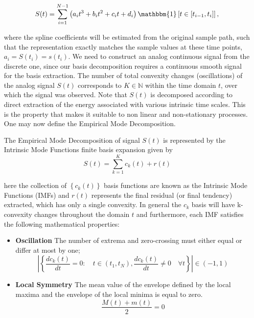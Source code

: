 \begin{equation}
\label{cubic_spl}
S(t) = \sum_{i=1}^{N-1} \left(a_i t^3 +b_i t^2 + c_i t +d_i \right) \mathbbm{1} \left[ t \in \left[ t_{i-1},t_i \right] \right],
\end{equation} 

where the spline coefficients will be estimated from the original sample path, such that the representation exactly matches the sample values at these time points, $a_i = S(t_i) = s(t_i)$. We need to construct an analog continuous signal from the discrete one, since our basis decomposition requires a continuous smooth signal for the basis extraction. The number of total convexity changes (oscillations) of the analog signal $S(t)$ corresponds to $K \in \mathbb{N}$ within the time domain $t$, over which the signal was observed. Note that $S(t)$ is decomposed according to direct extraction of the energy associated with various intrinsic time scales. This is the property that makes it suitable to non linear and non-stationary processes. One may now define the  Empirical Mode Decomposition.


\begin{Definition}

The Empirical Mode Decomposition of signal $S(t)$ is represented by the Intrinsic Mode Functions finite basis expansion given by
\begin{equation}
\label{EMD-for}
S(t) = \sum_{k=1}^K c_k \left(t\right) + r \left(t \right)
\end{equation}

here the collection of $\left\{c_k(t)\right\}$ basis functions are known as the Intrinsic Mode Functions (IMFs) and $r \left(t \right)$ represents the final residual (or final tendency) extracted, which has only a single convexity. In general the $c_k$ basis will have k-convexity changes throughout the domain $t$ and furthermore, each IMF satisfies the following mathematical properties:
\begin{itemize}
\item \textbf{Oscillation} The number of extrema and zero-crossing must either equal or differ at most by one;
\begin{equation}
\left| \left\{ \frac{d c_k (t)}{dt} = 0 : \quad t \in \left( t_1, t_N \right), \frac{d c_k (t)}{dt} \neq 0 \quad \forall t    \right\} \right|  \in  \left( -1, 1 \right)
\end{equation}
\item \textbf{Local Symmetry} The mean value of the envelope defined by the local maxima and the envelope of the local minima is equal to zero.  
\begin{equation}
\frac{M(t) + m(t)}{2} = 0
\end{equation}
\end{itemize}
\end{Definition}

